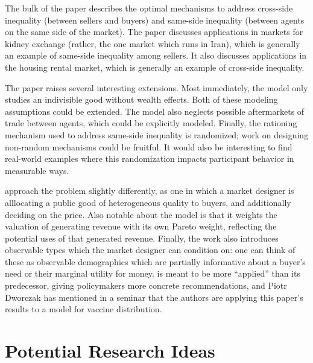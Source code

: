\documentclass[AER]{AEA}
\begin{document}
The bulk of the paper describes the optimal mechanisms to address cross-side inequality (between sellers and buyers) and same-side inequality (between agents on the same side of the market). The paper discusses applications in markets for kidney exchange (rather, the one market which runs in Iran), which is generally an example of same-side inequality among sellers. It also discusses applications in the housing rental market, which is generally an example of cross-side inequality.


The paper raises several interesting extensions. Most immediately, the model only studies an indivisible good without wealth effects. Both of these modeling assumptions could be extended. The model also neglects possible aftermarkets of trade between agents, which could be explicitly modeled. Finally, the rationing mechanism used to address same-side inequality is randomized; work on designing non-random mechanisms could be fruitful. It would also be interesting to find real-world examples where this randomization impacts participant behavior in measurable ways.


\cite{akbarpour-2020} approach the problem slightly differently, as one in which a market designer is alllocating a public good of heterogeneous quality to buyers, and additionally deciding on the price. Also notable about the \cite{akbarpour-2020} model is that it weights the valuation of generating revenue with its own Pareto weight, reflecting the potential uses of that generated revenue. Finally, the work also introduces observable types which the market designer can condition on: one can think of these as observable demographics which are partially informative about a buyer's need or their marginal utility for money. \cite{akbarpour-2020} is meant to be more ``applied'' than its predecessor, giving policymakers more concrete recommendations, and Piotr Dworczak has mentioned in a seminar that the authors are applying this paper's results to a model for vaccine distribution.

\section{Potential Research Ideas}
\label{sec:ideas}
\end{document}
